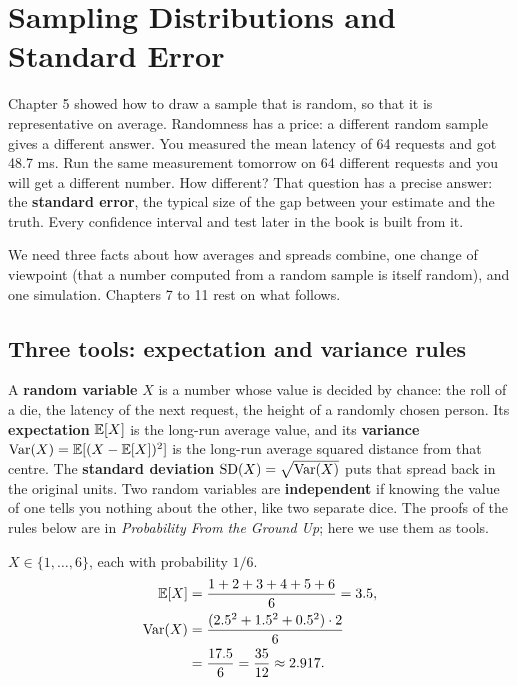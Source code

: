 \chapter{Sampling Distributions and Standard Error}
\label{ch:sampling-distributions}

Chapter 5 showed how to draw a sample that is random, so that it is
representative on average. Randomness has a price: a different random sample gives
a different answer. You measured the mean latency of 64 requests and got
48.7 ms. Run the same measurement tomorrow on 64 different requests and you will
get a different number. How different? That question has a precise answer: the
\textbf{standard error}, the typical size of the gap between your estimate and
the truth. Every confidence interval and test later in the book is built from it.

We need three facts about how averages and spreads combine, one change of viewpoint (that a number computed from a random sample is itself random), and one simulation. Chapters 7 to 11 rest on what follows.

\section{Three tools: expectation and variance rules}
\label{sec:sd-tools}

A \textbf{random variable} $X$ is a number whose value is decided by chance: the
roll of a die, the latency of the next request, the height of a randomly chosen
person. Its \textbf{expectation} $\operatorname{\mathbb{E}}[X]$ is the long-run average value, and its
\textbf{variance} $\operatorname{Var}(X)=\operatorname{\mathbb{E}}[(X-\operatorname{\mathbb{E}}[X])^2]$ is the long-run average squared distance
from that centre. The \textbf{standard deviation} $\operatorname{SD}(X)=\sqrt{\operatorname{Var}(X)}$ puts
that spread back in the original units. Two random variables are
\textbf{independent} if knowing the value of one tells you nothing about the
other, like two separate dice. The proofs of the rules below are in
\emph{Probability From the Ground Up}; here we use them as tools.

\begin{example}
$X\in\{1,\dots,6\}$, each with probability $1/6$.
\begin{align*}
\operatorname{\mathbb{E}}[X] &= \frac{1+2+3+4+5+6}{6} = 3.5, \\
\operatorname{Var}(X) &= \frac{(2.5^2+1.5^2+0.5^2)\cdot 2}{6} \\
&= \frac{17.5}{6} = \frac{35}{12} \approx 2.917.
\end{align*}
\end{example}

